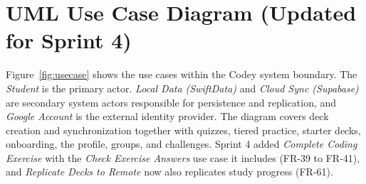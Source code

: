 \documentclass[12pt,letterpaper]{article}
\begin{document}
\section{UML Use Case Diagram (Updated for Sprint 4)}\label{sec:usecase}
Figure~\ref{fig:usecase} shows the use cases within the Codey system boundary. The
\emph{Student} is the primary actor. \emph{Local Data (SwiftData)} and \emph{Cloud
Sync (Supabase)} are secondary system actors responsible for persistence and
replication, and \emph{Google Account} is the external identity provider. The
diagram covers deck creation and synchronization together with quizzes, tiered
practice, starter decks, onboarding, the profile, groups, and challenges. Sprint 4
added \emph{Complete Coding Exercise} with the \emph{Check Exercise Answers} use
case it includes (FR-39 to FR-41), and \emph{Replicate Decks to Remote} now also
replicates study progress (FR-61).
\end{document}
